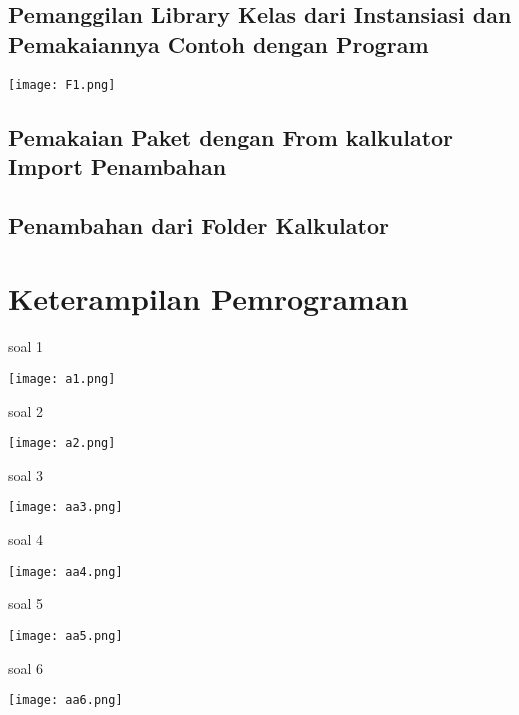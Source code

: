 \documentclass{article}
\begin{document}
\subsection{Pemanggilan Library Kelas dari Instansiasi dan Pemakaiannya Contoh dengan Program}

    \begin{center}
        \texttt{[image: F1.png]}
    \end{center}
    
\subsection{Pemakaian Paket dengan From kalkulator Import Penambahan}
\usepackage{Conoh:}
\usepackage{from kalkulator import penambahan}
 
 \subsection{Penambahan dari Folder Kalkulator}
 \usepackage{Ketikan terlebih dahulu nama folder Kemudian ketikan import library.}
\usepackage{contoh:}
\usepackage{from library import kelas2}

\section{Keterampilan Pemrograman}
soal 1
\begin{center}
    \texttt{[image: a1.png]}
\end{center}

soal 2
\begin{center}
    \texttt{[image: a2.png]}
\end{center}

soal 3
\begin{center}
    \texttt{[image: aa3.png]}
\end{center}

soal 4
\begin{center}
    \texttt{[image: aa4.png]}
\end{center}

soal 5
\begin{center}
    \texttt{[image: aa5.png]}
\end{center}

soal 6
\begin{center}
    \texttt{[image: aa6.png]}
\end{center}
\end{document}
